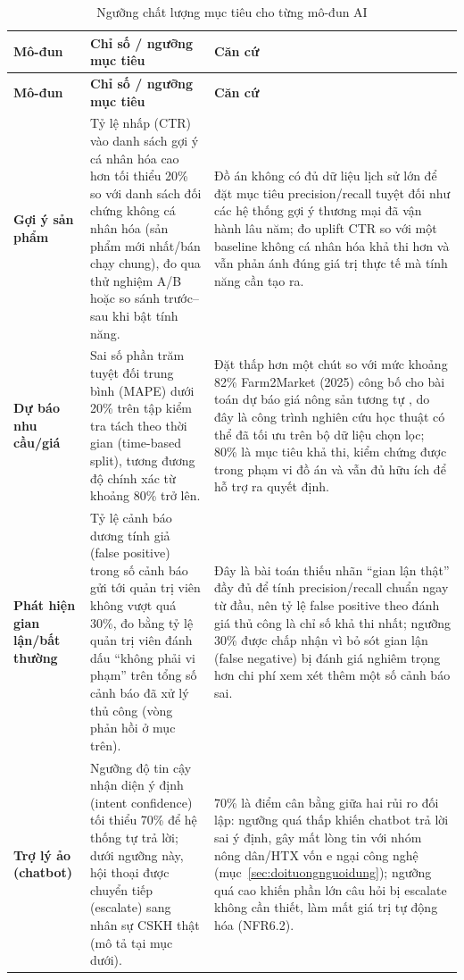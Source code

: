 \begingroup
\small
\renewcommand{\arraystretch}{1.3}
\setlength{\tabcolsep}{5pt}
\begin{longtable}{L{2.2cm} L{5.3cm} L{5.7cm}}
\caption{Ngưỡng chất lượng mục tiêu cho từng mô-đun AI}
\label{tab:nguongAI} \\
\toprule
{}
\textbf{Mô-đun} & \textbf{Chỉ số / ngưỡng mục tiêu} & \textbf{Căn cứ} \\
\midrule
\endfirsthead
\toprule
{}
\textbf{Mô-đun} & \textbf{Chỉ số / ngưỡng mục tiêu} & \textbf{Căn cứ} \\
\midrule
\endhead
\bottomrule
\endfoot
\textbf{Gợi ý sản phẩm} &
Tỷ lệ nhấp (CTR) vào danh sách gợi ý cá nhân hóa cao hơn tối thiểu 20\% so với danh sách đối chứng không cá nhân hóa (sản phẩm mới nhất/bán chạy chung), đo qua thử nghiệm A/B hoặc so sánh trước--sau khi bật tính năng. &
Đồ án không có đủ dữ liệu lịch sử lớn để đặt mục tiêu precision/recall tuyệt đối như các hệ thống gợi ý thương mại đã vận hành lâu năm; đo uplift CTR so với một baseline không cá nhân hóa khả thi hơn và vẫn phản ánh đúng giá trị thực tế mà tính năng cần tạo ra. \\
\textbf{Dự báo nhu cầu/giá} &
Sai số phần trăm tuyệt đối trung bình (MAPE) dưới 20\% trên tập kiểm tra tách theo thời gian (time-based split), tương đương độ chính xác từ khoảng 80\% trở lên. &
Đặt thấp hơn một chút so với mức khoảng 82\% Farm2Market (2025) công bố cho bài toán dự báo giá nông sản tương tự \cite{farm2market_2025}, do đây là công trình nghiên cứu học thuật có thể đã tối ưu trên bộ dữ liệu chọn lọc; 80\% là mục tiêu khả thi, kiểm chứng được trong phạm vi đồ án và vẫn đủ hữu ích để hỗ trợ ra quyết định. \\
\textbf{Phát hiện gian lận/bất thường} &
Tỷ lệ cảnh báo dương tính giả (false positive) trong số cảnh báo gửi tới quản trị viên không vượt quá 30\%, đo bằng tỷ lệ quản trị viên đánh dấu ``không phải vi phạm'' trên tổng số cảnh báo đã xử lý thủ công (vòng phản hồi ở mục trên). &
Đây là bài toán thiếu nhãn ``gian lận thật'' đầy đủ để tính precision/recall chuẩn ngay từ đầu, nên tỷ lệ false positive theo đánh giá thủ công là chỉ số khả thi nhất; ngưỡng 30\% được chấp nhận vì bỏ sót gian lận (false negative) bị đánh giá nghiêm trọng hơn chi phí xem xét thêm một số cảnh báo sai. \\
\textbf{Trợ lý ảo (chatbot)} &
Ngưỡng độ tin cậy nhận diện ý định (intent confidence) tối thiểu 70\% để hệ thống tự trả lời; dưới ngưỡng này, hội thoại được chuyển tiếp (escalate) sang nhân sự CSKH thật (mô tả tại mục dưới). &
70\% là điểm cân bằng giữa hai rủi ro đối lập: ngưỡng quá thấp khiến chatbot trả lời sai ý định, gây mất lòng tin với nhóm nông dân/HTX vốn e ngại công nghệ (mục~\ref{sec:doituongnguoidung}); ngưỡng quá cao khiến phần lớn câu hỏi bị escalate không cần thiết, làm mất giá trị tự động hóa (NFR6.2). \\
\end{longtable}
\endgroup

